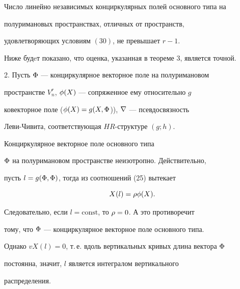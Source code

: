 \begin{thm}


Число линейно независимых конциркулярных полей основного типа на


полуримановых пространствах, отличных от пространств,


удовлетворяющих условиям $(30)$, не превышает $r-1$.


\end{thm}





Ниже будeт показано, что оценка, указанная в теореме 3, является точной.


\medskip





2. Пусть $\Phi$ --- конциркулярное векторное поле на полуримановом


пространстве $V^r_n$, $\phi(X)$ --- сопряженное ему относительно $g$


ковекторное поле ($\phi(X)=g(X,\Phi$)), $\nabla$ --- псевдосвязность


Леви-Чивита, соответствующая $HR$-структуре $(g;h)$.





\begin{note}


Конциркулярное векторное поле основного типа


$\Phi$ на полуримановом пространстве неизотропно. Действительно,


пусть $l=g(\Phi,\Phi)$, тогда из соотношений (25) вытекает


\begin{equation}


X(l)=\ro\f(X).


\end{equation}


Следовательно, если $l=\text{const}$, то $\rho=0$. А это противоречит


тому, что $\Phi$ --- конциркулярное векторное поле основного типа.


Однако $vX(l)=0$, т.\,е. вдоль вертикальных кривых длина вектора $\Phi$


постоянна, значит, $l$ является интегралом вертикального


распределения.


\end{note}





